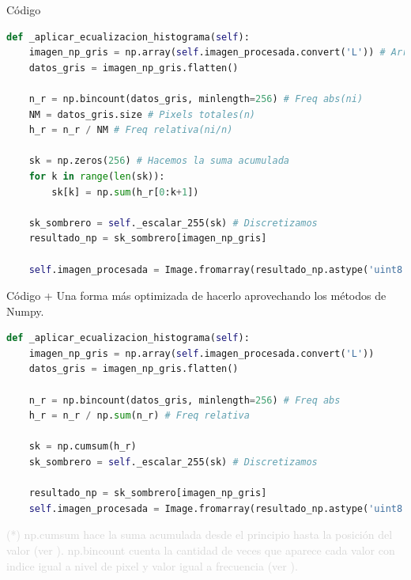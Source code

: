 \documentclass{beamer}
\begin{document}
\begin{frame}[fragile]{Código}
	\justifying
	
	\begin{lstlisting}[language=Python]
def _aplicar_ecualizacion_histograma(self):
	imagen_np_gris = np.array(self.imagen_procesada.convert('L')) # Array de la forma (m. n).
	datos_gris = imagen_np_gris.flatten()
	
	n_r = np.bincount(datos_gris, minlength=256) # Freq abs(ni)
	NM = datos_gris.size # Pixels totales(n)
	h_r = n_r / NM # Freq relativa(ni/n)
	
	sk = np.zeros(256) # Hacemos la suma acumulada
	for k in range(len(sk)):
		sk[k] = np.sum(h_r[0:k+1])
	
	sk_sombrero = self._escalar_255(sk) # Discretizamos
	resultado_np = sk_sombrero[imagen_np_gris]
	
	self.imagen_procesada = Image.fromarray(resultado_np.astype('uint8')).convert('RGB')
	\end{lstlisting}
\end{frame}

\begin{frame}[fragile]{Código +}
	\justifying
	Una forma más optimizada de hacerlo aprovechando los métodos de Numpy.
	
	\begin{lstlisting}[language=Python]
def _aplicar_ecualizacion_histograma(self):
	imagen_np_gris = np.array(self.imagen_procesada.convert('L'))
	datos_gris = imagen_np_gris.flatten()
	
	n_r = np.bincount(datos_gris, minlength=256) # Freq abs
	h_r = n_r / np.sum(n_r) # Freq relativa
	
	sk = np.cumsum(h_r)
	sk_sombrero = self._escalar_255(sk) # Discretizamos
	
	resultado_np = sk_sombrero[imagen_np_gris]
	self.imagen_procesada = Image.fromarray(resultado_np.astype('uint8')).convert('RGB')
	\end{lstlisting}
	
	\vfill
	\footnotesize \textcolor{lightgray}{(*) np.cumsum hace la suma acumulada desde el principio hasta la posición del valor (ver \cite{numpy.cumsum}). np.bincount cuenta la cantidad de veces que aparece cada valor con indice igual a nivel de pixel y valor igual a frecuencia (ver \cite{numpy.bincount}).}
\end{frame}
\end{document}
